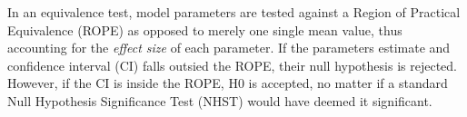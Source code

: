 In an equivalence test, model parameters are tested against a Region of Practical Equivalence (ROPE) as opposed to merely one single mean value, thus accounting for the \emph{effect size} of each parameter.
If the parameters estimate and confidence interval (CI) falls outsied the ROPE, their null hypothesis is rejected. However, if the CI is inside the ROPE, H0 is accepted, no matter if a standard Null Hypothesis Significance Test (NHST) would have deemed it significant.




